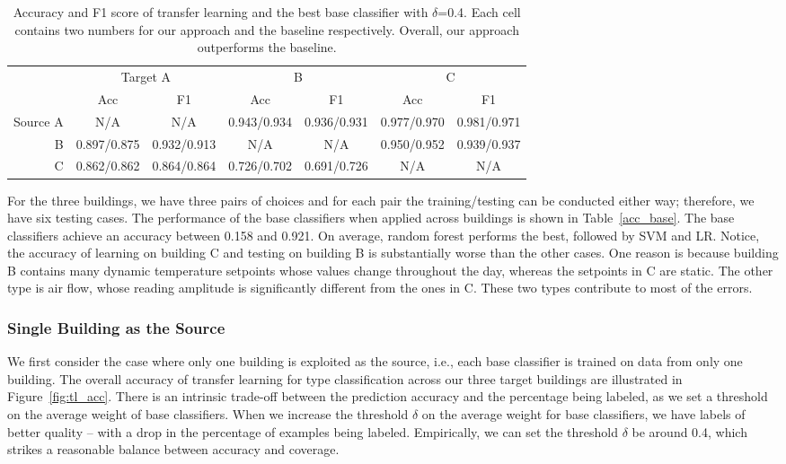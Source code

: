 \begin{table}[]
\centering
\begin{tabular}{r|c|c|c|c|c|c}
\hline
\multirow{2}{*}{} & \multicolumn{2}{c|}{Target A} & \multicolumn{2}{c|}{B} & \multicolumn{2}{c}{C} \\ \cline{2-7} 
                  & Acc        & F1        & Acc        & F1        & Acc        & F1        \\ \hline
Source A                 & N/A      & N/A     & 0.943/0.934      & 0.936/0.931     & 0.977/0.970      & 0.981/0.971     \\ \hline
B                 & 0.897/0.875     & 0.932/0.913     & N/A      & N/A     & 0.950/0.952      & 0.939/0.937     \\ \hline
C                 & 0.862/0.862     & 0.864/0.864     & 0.726/0.702      & 0.691/0.726     & N/A     & N/A     \\ \hline
\end{tabular}
\caption{Accuracy and F1 score of transfer learning and the best base classifier with $\delta$=0.4. Each cell contains two numbers for our approach and the baseline respectively. Overall, our approach outperforms the baseline.}
\label{table:f1}
\end{table}

For the three buildings, we have three pairs of choices and for each pair the training/testing can be conducted either way; therefore, we have six testing cases.
The performance of the base classifiers when applied across buildings is shown in Table~\ref{acc_base}.  The base classifiers achieve an accuracy between 0.158 and 0.921.
On average, random forest performs the best, followed by SVM and LR. 
Notice, the accuracy of learning on building C and testing on building B is substantially worse than the other cases. 
One reason is because building B contains many dynamic temperature setpoints whose values change throughout the day, whereas the setpoints in C are static. 
The other type is air flow, whose reading amplitude is significantly different from the ones in C. These two types contribute to most of the errors. %


\subsubsection{Single Building as the Source}
We first consider the case where only one building is exploited as the source, i.e., each base classifier is trained on data from only one building. 
The overall accuracy of transfer learning for type classification across our three target buildings are illustrated in Figure~\ref{fig:tl_acc}.
There is an intrinsic trade-off between the prediction accuracy and the percentage being labeled, as we set a threshold on the average weight of base classifiers. 
When we increase the threshold $\delta$ on the average weight for base classifiers, we have labels of better quality -- with a drop in the percentage of examples being labeled. 
Empirically, we can set the threshold $\delta$ be around 0.4, which strikes a reasonable balance between accuracy and coverage.

